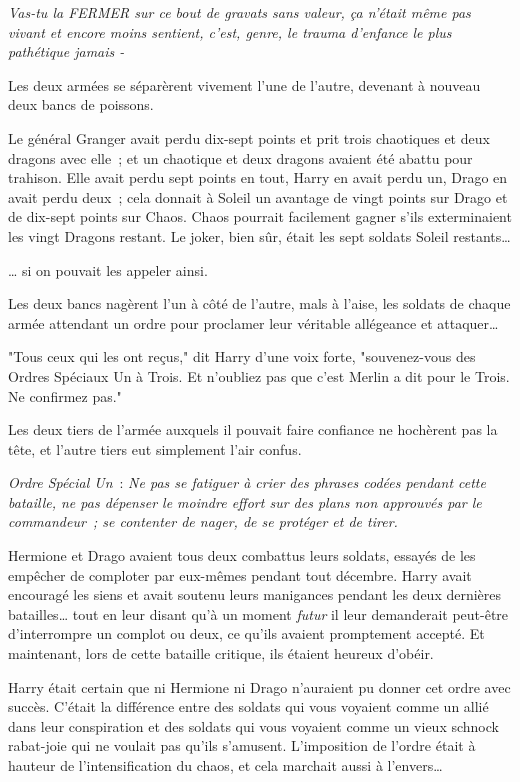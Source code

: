 \emph{Vas-tu la FERMER sur ce bout de gravats sans valeur, ça n'était même pas vivant et encore moins sentient, c'est, genre, le trauma d'enfance le plus pathétique jamais -}

Les deux armées se séparèrent vivement l'une de l'autre, devenant à nouveau deux bancs de poissons.

Le général Granger avait perdu dix-sept points et prit trois chaotiques et deux dragons avec elle~; et un chaotique et deux dragons avaient été abattu pour trahison. Elle avait perdu sept points en tout, Harry en avait perdu un, Drago en avait perdu deux~; cela donnait à Soleil un avantage de vingt points sur Drago et de dix-sept points sur Chaos. Chaos pourrait facilement gagner s'ils exterminaient les vingt Dragons restant. Le joker, bien sûr, était les sept soldats Soleil restants…

… si on pouvait les appeler ainsi.

Les deux bancs nagèrent l'un à côté de l'autre, mals à l'aise, les soldats de chaque armée attendant un ordre pour proclamer leur véritable allégeance et attaquer…

"Tous ceux qui les ont reçus," dit Harry d'une voix forte, "souvenez-vous des Ordres Spéciaux Un à Trois. Et n'oubliez pas que c'est Merlin a dit pour le Trois. Ne confirmez pas."

Les deux tiers de l'armée auxquels il pouvait faire confiance ne hochèrent pas la tête, et l'autre tiers eut simplement l'air confus.

\emph{Ordre Spécial Un}~: \emph{Ne pas se fatiguer à crier des phrases codées pendant cette bataille, ne pas dépenser le moindre effort sur des plans non approuvés par le commandeur~; se contenter de nager, de se protéger et de tirer.}

Hermione et Drago avaient tous deux combattus leurs soldats, essayés de les empêcher de comploter par eux-mêmes pendant tout décembre. Harry avait encouragé les siens et avait soutenu leurs manigances pendant les deux dernières batailles… tout en leur disant qu'à un moment \emph{futur} il leur demanderait peut-être d'interrompre un complot ou deux, ce qu'ils avaient promptement accepté. Et maintenant, lors de cette bataille critique, ils étaient heureux d'obéir.

Harry était certain que ni Hermione ni Drago n'auraient pu donner cet ordre avec succès. C'était la différence entre des soldats qui vous voyaient comme un allié dans leur conspiration et des soldats qui vous voyaient comme un vieux schnock rabat-joie qui ne voulait pas qu'ils s'amusent. L'imposition de l'ordre était à hauteur de l'intensification du chaos, et cela marchait aussi à l'envers…

